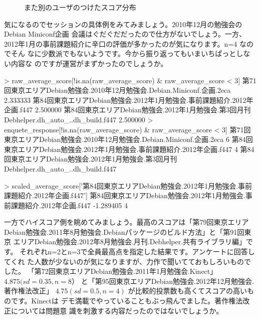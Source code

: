 \documentclass[mingoth,a4paper]{jsarticle}
\begin{document}
\begin{figure}[ht]
\begin{minipage}{0.5\hsize}
\begin{center}
\end{center} 
 \caption{また別のユーザのつけたスコア分布}
 \label{fig:example-user-score-2}
\end{minipage}
\end{figure}

気になるのでセッションの具体例をみてみましょう。2010年12月の勉強会のDebian Miniconf企画
会議はぐだぐだだったので仕方がないでしょう。一方、
2012年1月の事前課題紹介に辛口の評価が多かったのが気になります。n=4 なのでそん
なに少数派でもないようです。今から振り返ってもいまいちぱっとしない内容な
のですが運営がまずかったのでしょうか。

\begin{commandline}
> raw_average_score[!is.na(raw_average_score) & raw_average_score < 3]
                第71回東京エリアDebian勉強会.2010年12月勉強会.Debian.Miniconf.企画.2eca 
                                                                               2.333333 
              第84回東京エリアDebian勉強会.2012年1月勉強会.事前課題紹介.2012年企画.f447 
                                                                               2.500000 
第84回東京エリアDebian勉強会.2012年1月勉強会.第3回月刊Debhelper.dh_auto_..dh_build.f447 
                                                                               2.500000 
> enquete_response[!is.na(raw_average_score) & raw_average_score < 3]
                第71回東京エリアDebian勉強会.2010年12月勉強会.Debian.Miniconf.企画.2eca 
                                                                                      6 
              第84回東京エリアDebian勉強会.2012年1月勉強会.事前課題紹介.2012年企画.f447 
                                                                                      4 
第84回東京エリアDebian勉強会.2012年1月勉強会.第3回月刊Debhelper.dh_auto_..dh_build.f447 

> scaled_average_score['第84回東京エリアDebian勉強会.2012年1月勉強会.事前課題紹介.2012年企画.f447']
第84回東京エリアDebian勉強会.2012年1月勉強会.事前課題紹介.2012年企画.f447 
                                                                -1.289405 
                                                                                      4 
\end{commandline}

一方でハイスコア側を眺めてみましょう。最高のスコアは「第79回東京エリア
Debian勉強会.2011年8月勉強会.Debianパッケージのビルド方法」と「第91回東京
エリアDebian勉強会.2012年8月勉強会.月刊.Debhelper.共有ライブラリ編」です。
それぞれn=2とn=3で全員最高点を指定した結果です。アンケートに回答してくれ
た人数が少ないのが気になりますが、力作で聞いてておもしろいものでした。
「第72回東京エリアDebian勉強会.2011年1月勉強会.Kinect」$ 4.875 (sd=0.35,
n=8）$ と「第95回東京エリアDebian勉強会.2012年12月勉強会.著作権法改正」
$4.75 (sd=0.5, n=4)$ が比較的投票数も高くてスコアの高いものです。Kinectは
デモ満載でやっていることもぶっ飛んでました。著作権法改正については問題意
識を刺激する内容だったのではないでしょうか。
\end{document}
